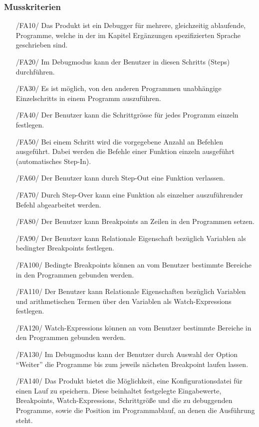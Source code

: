 \documentclass[parskip=full]{scrartcl}
\begin{document}
 		\subsubsection{Musskriterien}
		\begin{itemize}
		\item[/FA10/] Das Produkt ist ein \gls{Debugger} für mehrere, gleichzeitig ablaufende, Programme, welche in der im Kapitel Ergänzungen spezifizierten Sprache geschrieben sind.
		\item[/FA20/] Im Debugmodus kann der Benutzer in diesen \glspl{Schritt} (Steps) durchführen.
		\item[/FA30/] Es ist möglich, von den anderen Programmen unabhängige \glspl{Einzelschritt} in einem Programm auszuführen.
                \item[/FA40/] Der Benutzer kann die \gls{Schrittgrösse} für jedes Programm einzeln festlegen.
		\item[/FA50/] Bei einem Schritt wird die vorgegebene Anzahl an Befehlen ausgeführt. Dabei werden die Befehle einer Funktion einzeln ausgeführt (automatisches Step-In). 
		\item[/FA60/] Der Benutzer kann durch \gls{Step-Out} eine Funktion verlassen.
		\item[/FA70/] Durch \gls{Step-Over} kann eine Funktion als einzelner auszuführender Befehl abgearbeitet werden.
		\item[/FA80/] Der Benutzer kann \glspl{Breakpoint} an Zeilen in den Programmen setzen.
                \item[/FA90/] Der Benutzer kann \gls{Relationale Eigenschaft} bezüglich Variablen als \glspl{bedingter Breakpoint} festlegen. %
		\item[/FA100/] Bedingte Breakpoints können an vom Benutzer bestimmte Bereiche in den Programmen gebunden werden.
		\item[/FA110/] Der Benutzer kann Relationale Eigenschaften bezüglich Variablen und arithmetischen Termen über den Variablen als \glspl{Watch-Expression} festlegen.
		\item[/FA120/] Watch-Expressions können an vom Benutzer bestimmte Bereiche in den Programmen gebunden werden.
		\item[/FA130/] Im \gls{Debugmodus} kann der Benutzer durch Auswahl der Option \enquote{Weiter} die Programme bis zum jeweils nächsten Breakpoint laufen lassen.
		\item[/FA140/] Das Produkt bietet die Möglichkeit, eine \gls{Konfigurationsdatei} für einen Lauf zu speichern. Diese beinhaltet festgelegte Eingabewerte, Breakpoints, Watch-Expressions, Schrittgröße und die zu debuggenden Programme, sowie die Position im Programmablauf, an denen die Ausführung steht.

\end{itemize}
\end{document}
